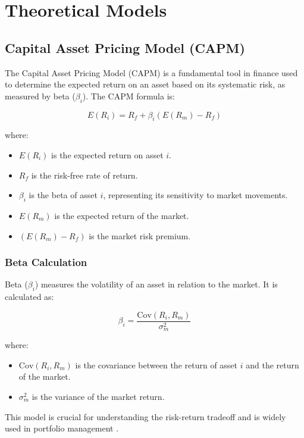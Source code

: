 \section{Theoretical Models}

\subsection{Capital Asset Pricing Model (CAPM)}
The Capital Asset Pricing Model (CAPM) is a fundamental tool in finance used to determine the expected return on an asset based on its systematic risk, as measured by beta ($\beta_i$). The CAPM formula is:

\begin{equation}
E(R_i) = R_f + \beta_i(E(R_m) - R_f)
\end{equation}

where:
\begin{itemize}
    \item $E(R_i)$ is the expected return on asset $i$.
    \item $R_f$ is the risk-free rate of return.
    \item $\beta_i$ is the beta of asset $i$, representing its sensitivity to market movements.
    \item $E(R_m)$ is the expected return of the market.
    \item $(E(R_m) - R_f)$ is the market risk premium.
\end{itemize}

\subsubsection{Beta Calculation}
Beta ($\beta_i$) measures the volatility of an asset in relation to the market. It is calculated as:

\begin{equation}
\beta_i = \frac{\text{Cov}(R_i, R_m)}{\sigma^2_m}
\end{equation}

where:
\begin{itemize}
    \item $\text{Cov}(R_i, R_m)$ is the covariance between the return of asset $i$ and the return of the market.
    \item $\sigma^2_m$ is the variance of the market return.
\end{itemize}
This model is crucial for understanding the risk-return tradeoff and is widely used in portfolio management \citep{fama1973risk}.

